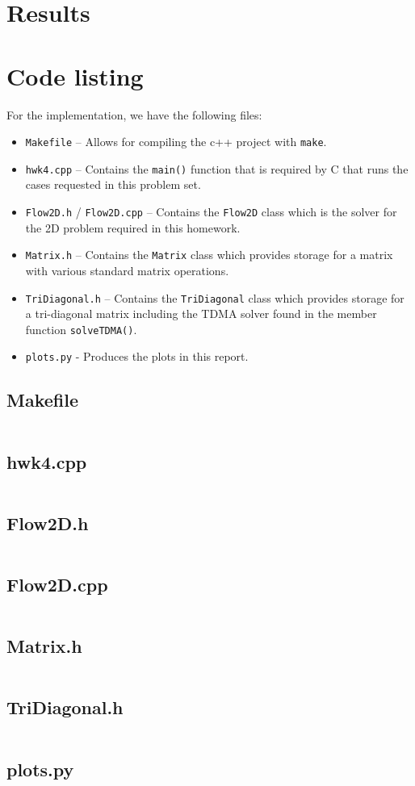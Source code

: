 \documentclass{article}
\begin{document}
\section*{Results}

\section*{Code listing}

For the implementation, we have the following files:
\begin{itemize}
	\item \texttt{Makefile} -- Allows for compiling the c++ project with \texttt{make}.
	\item \texttt{hwk4.cpp} -- Contains the \texttt{main()} function that is required by C that runs the cases requested in this problem set.
	\item \texttt{Flow2D.h} / \texttt{Flow2D.cpp} -- Contains the \texttt{Flow2D} class which is the solver for the 2D problem required in this homework.
	\item \texttt{Matrix.h} -- Contains the \texttt{Matrix} class which provides storage for a matrix with various standard matrix operations.
	\item \texttt{TriDiagonal.h} -- Contains the \texttt{TriDiagonal} class which provides storage for a tri-diagonal matrix including the TDMA solver found in the member function \texttt{solveTDMA()}.
	\item \texttt{plots.py} - Produces the plots in this report.
\end{itemize}

\subsection*{Makefile}
\inputminted[fontsize=\footnotesize]{Makefile}{../Makefile}

\subsection*{hwk4.cpp}
\inputminted[fontsize=\footnotesize]{c++}{../hwk4.cpp}

\subsection*{Flow2D.h}
\inputminted[fontsize=\footnotesize]{c++}{../Flow2D.h}

\subsection*{Flow2D.cpp}
\inputminted[fontsize=\footnotesize]{c++}{../Flow2D.cpp}

\subsection*{Matrix.h}
\inputminted[fontsize=\footnotesize]{c++}{../Matrix.h}

\subsection*{TriDiagonal.h}
\inputminted[fontsize=\footnotesize]{c++}{../TriDiagonal.h}

\subsection*{plots.py}
\end{document}
